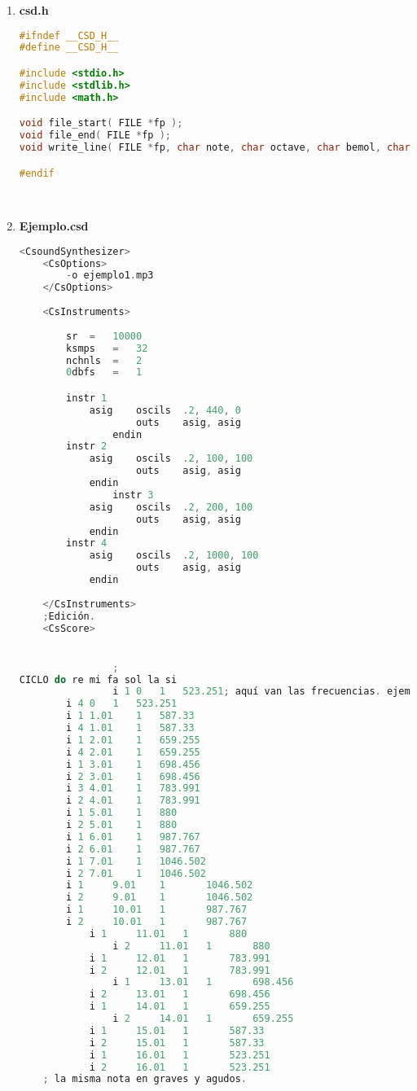 \documentclass[12pt]{article}
\begin{document}
\begin{enumerate}
\begin{lstlisting}[language=C]
	frequency = frequency * pow( 2, octaven - 1 );

	fprintf( fp, "\t\ti1\t%f\t1\t%f\n", start, frequency );
}
\end{lstlisting}\\

\item {\bf csd.h}\\
\begin{lstlisting}[language=C]
#ifndef __CSD_H__
#define __CSD_H__

#include <stdio.h>
#include <stdlib.h>
#include <math.h>

void file_start( FILE *fp );
void file_end( FILE *fp );
void write_line( FILE *fp, char note, char octave, char bemol, char sharp, float start );

#endif
\end{lstlisting}\\


\item {\bf Ejemplo.csd}\\
\begin{lstlisting}[language=C]
<CsoundSynthesizer>	
	<CsOptions>
		-o ejemplo1.mp3
	</CsOptions>
	
	<CsInstruments>
	
		sr	=	10000
		ksmps	=	32
		nchnls	=	2
		0dbfs	=	1

		instr 1
			asig    oscils	.2, 440, 0
        			outs    asig, asig
                endin
		instr 2
			asig    oscils	.2, 100, 100
        			outs    asig, asig
	        endin
                instr 3
			asig    oscils	.2, 200, 100
        			outs    asig, asig
	        endin
		instr 4
			asig    oscils	.2, 1000, 100
        			outs    asig, asig
	        endin
	
	</CsInstruments>
	;Edición.
	<CsScore>


                ;
CICLO do re mi fa sol la si
                i 1	0	1	523.251; aquí van las frecuencias. ejemplo este es un Do o C
		i 4	0	1	523.251
		i 1	1.01	1	587.33
		i 4	1.01	1	587.33
		i 1	2.01	1	659.255
		i 4	2.01	1	659.255
		i 1	3.01	1	698.456
		i 2	3.01	1	698.456
		i 3	4.01	1	783.991
		i 2	4.01	1	783.991
		i 1	5.01	1	880
		i 2	5.01	1	880
		i 1	6.01	1	987.767
		i 2	6.01	1	987.767
		i 1	7.01	1	1046.502
		i 2	7.01	1	1046.502
		i 1     9.01    1       1046.502
		i 2     9.01    1       1046.502
		i 1     10.01   1       987.767
		i 2     10.01   1       987.767
        	i 1     11.01   1       880
                i 2     11.01   1       880
	        i 1     12.01   1       783.991
	        i 2     12.01   1       783.991
                i 1     13.01   1       698.456
        	i 2     13.01   1       698.456
	        i 1     14.01   1       659.255
                i 2     14.01   1       659.255
        	i 1     15.01   1       587.33
        	i 2     15.01   1       587.33
	        i 1     16.01   1       523.251
	        i 2     16.01   1       523.251
	; la misma nota en graves y agudos.
	

\end{lstlisting}
\end{enumerate}
\end{document}
